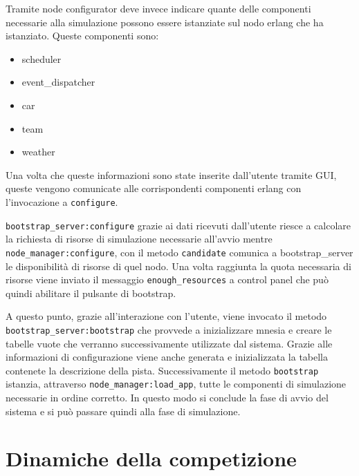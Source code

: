 \documentclass[11pt,a4paper]{report}
\newcommand{\fun}[1]{\texttt{#1}}
\begin{document}
Tramite node configurator deve invece indicare quante delle componenti necessarie alla simulazione possono essere istanziate sul nodo erlang che ha istanziato. Queste componenti sono:
\begin{itemize}
\item scheduler
\item event\_dispatcher
\item car
\item team
\item weather
\end{itemize}

Una volta che queste informazioni sono state inserite dall'utente tramite GUI, queste vengono comunicate alle corrispondenti componenti erlang con l'invocazione a \fun{configure}.

\fun{bootstrap\_server:configure} grazie ai dati ricevuti dall'utente riesce a calcolare la richiesta di risorse di simulazione necessarie all'avvio mentre \fun{node\_manager:configure}, con il metodo \fun{candidate} comunica a bootstrap\_server le disponibilità di risorse di quel nodo. Una volta raggiunta la quota necessaria di risorse viene inviato il messaggio \fun{enough\_resources} a control panel che può quindi abilitare il pulsante di bootstrap.

A questo punto, grazie all'interazione con l'utente, viene invocato il metodo \fun{bootstrap\_server:bootstrap} che provvede a inizializzare mnesia e creare le tabelle vuote che verranno successivamente utilizzate dal sistema. Grazie alle informazioni di configurazione viene anche generata e inizializzata la tabella contenete la descrizione della pista. Successivamente il metodo \fun{bootstrap} istanzia, attraverso \fun{node\_manager:load\_app}, tutte le componenti di simulazione necessarie in ordine corretto.
In questo modo si conclude la fase di avvio del sistema e si può passare quindi alla fase di simulazione.
\section{Dinamiche della competizione}
\end{document}
